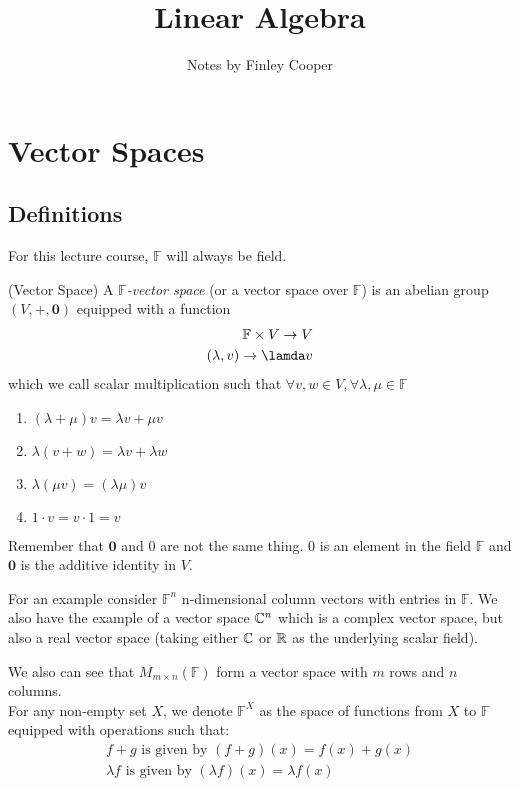 \documentclass{article}
\title{Linear Algebra}
\author{Notes by Finley Cooper}
\newcommand{\F}{\mathbb{F}}
\begin{document}
  \maketitle
  \newpage
  \tableofcontents
  \newpage
  \section{Vector Spaces}
  \subsection{Definitions}
  For this lecture course, $ \F $ will always be field.
  \begin{definition}
	  (Vector Space) A $ \F $\textit{-vector space} (or a vector space over $ \F $) is an abelian group $ (V,+,\boldsymbol 0) $ equipped with a function
	  \begin{align*}
	    \F\times V\to V \\
	    (\lambda, v)\to \lamda v
	  \end{align*}
	  which we call scalar multiplication such that $ \forall v,w\in V, \forall \lambda,\mu\in\F $
	  \begin{enumerate} 
		  \item $ (\lambda + \mu)v=\lambda v + \mu v $
		  \item $ \lambda(v + w)=\lambda v + \lambda w $
		  \item $ \lambda(\mu v)=(\lambda \mu)v $
		  \item $ 1\cdot v = v\cdot 1 = v $
	  \end{enumerate}
  \end{definition}
  Remember that $ \boldsymbol 0 $ and $ 0 $ are not the same thing. $ 0 $ is an element in the field $ \F $ and $ \boldsymbol 0 $ is the additive identity in $ V $.\par
  For an example consider $ \F^n $ n-dimensional column vectors with entries in $ \F $. We also have the example of a vector space $ \mathbb{C}^n $ which is a complex vector space, but also a real vector space (taking either $ \mathbb{C} $ or $ \mathbb{R} $ as the underlying scalar field).\par
  We also can see that $ M_{m\times n}(\F) $ form a vector space with $ m $ rows and $ n $ columns.\\
  For any non-empty set $ X $, we denote $ \F^X $ as the space of functions from $ X $ to $ \F $ equipped with operations such that:
\begin{align*}
	f+g \text{ is given by } (f+g)(x)=f(x)+g(x)\\
	\lambda f \text{ is given by } (\lambda f)(x)=\lambda f(x)
\end{align*}
\end{document}
